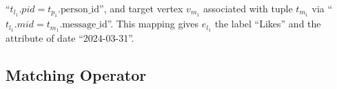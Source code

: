 \begin{example}
    ``$t_{l_1}.pid = t_{p_1}.\text{person\_id}$'', and target vertex $v_{m_1}$ associated with tuple $t_{m_1}$
    via ``$t_{l_1}.mid = t_{m_1}.\text{message\_id}$''. This mapping gives $e_{l_1}$ the label ``Likes'' and the attribute of date ``2024-03-31''.
\end{example}


\subsection{Matching Operator}
\label{sec:graph-relational-algebra}


